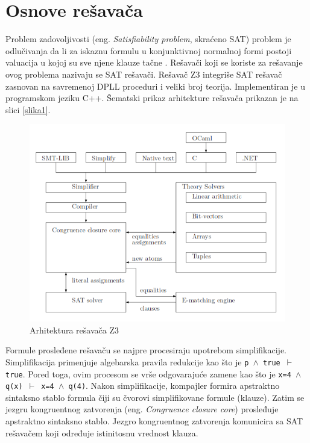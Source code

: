\documentclass[12pt,oneside]{memoir}
\begin{document}
\section{Osnove rešavača}  \label{sec:num1}
Problem zadovoljivosti (eng. \textit{Satisfiability problem}, skraćeno SAT) problem je odlučivanja da li za iskaznu formulu u konjunktivnoj normalnoj formi postoji valuacija u kojoj su sve njene 
klauze tačne \cite{Handbook}. 
Rešavači koji se koriste za rešavanje ovog problema nazivaju se SAT rešavači.   
Rešavač Z3 integriše SAT rešavač zasnovan na savremenoj DPLL proceduri i veliki broj teorija. 
Implementiran je u programskom jeziku C++. Šematski prikaz arhitekture \cite{EfficientSMTSolver} rešavača prikazan je na slici \ref{slika1}. 
\begin{figure}[!ht]\label{slika1}
  \centering
  \includegraphics[width=1\textwidth]{arhitektura.png}
  \caption{Arhitektura rešavača Z3}
  \label{fig:arhitektura}
\end{figure}
\par
Formule prosleđene rešavaču se najpre procesiraju upotrebom simplifikacije. Simplifikacija primenjuje algebarska pravila redukcije kao što je \texttt{p $\land$ true $\vdash$ true}. Pored toga, ovim procesom se vrše odgovarajuće zamene kao što je \texttt{x=4 $\land$ q(x) $\vdash$ x=4 $\land$ q(4)}.
Nakon simplifikacije, kompajler formira apstraktno sintaksno stablo formula čiji su čvorovi simplifikovane formule (klauze). Zatim se jezgru kongruentnog zatvorenja (eng. 
\textit{Congruence closure core}) prosleđuje apstraktno sintaksno stablo. Jezgro kongruentnog zatvorenja komunicira sa SAT rešavačem koji određuje istinitosnu vrednost klauza. 
\par
\end{document}
